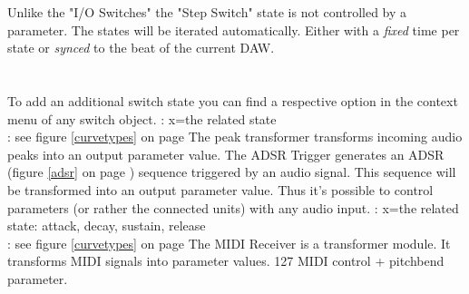 Unlike the "I/O Switches" the "Step Switch" state is not controlled by a parameter. The states will be iterated automatically. Either with a \emph{fixed} time per state or \emph{synced} to the beat of the current DAW.\\
\\\\
	To add an additional switch state you can find a respective option in the context menu of any switch object.   
	\bParameterlist
	\eParameterlist
\stern : x=the related state \\
\sstern : see figure \ref{curvetypes} on page \pageref{curvetypes}
The peak transformer transforms incoming audio peaks into an output parameter value.
	\bParameterlist
	\eParameterlist
The ADSR Trigger generates an ADSR (figure \ref{adsr} on page \pageref{adsr}) sequence triggered by an audio signal. This sequence will be transformed into an output parameter value. Thus it's possible to control parameters (or rather the connected units) with any audio input.
	\bParameterlist
	\eParameterlist
\stern : x=the related state: attack, decay, sustain, release \\
\sstern : see figure \ref{curvetypes} on page \pageref{curvetypes}
The MIDI Receiver is a transformer module. It transforms MIDI signals into parameter values.
127 MIDI control + pitchbend parameter. 

